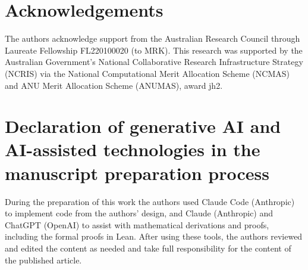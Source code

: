 \documentclass[preprint,12pt,authoryear]{elsarticle}
\begin{document}
\section*{Acknowledgements}

The authors acknowledge support from the Australian Research Council through Laureate Fellowship FL220100020 (to MRK). This research was supported by the Australian Government's National Collaborative Research Infrastructure Strategy (NCRIS) via the National Computational Merit Allocation Scheme (NCMAS) and ANU Merit Allocation Scheme (ANUMAS), award jh2.

\section*{Declaration of generative AI and AI-assisted technologies in the manuscript preparation process}

During the preparation of this work the authors used Claude Code (Anthropic) to implement code from the authors' design, and Claude (Anthropic) and ChatGPT (OpenAI) to assist with mathematical derivations and proofs, including the formal proofs in Lean. After using these tools, the authors reviewed and edited the content as needed and take full responsibility for the content of the published article.



\end{document}
